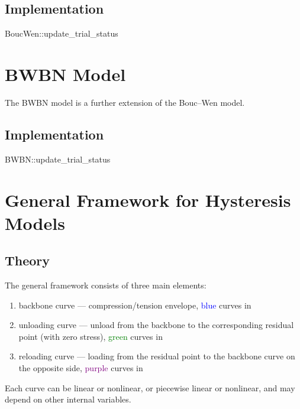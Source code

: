 \subsection{Implementation}
\begin{cppcode}
BoucWen::update_trial_status
\end{cppcode}
\section{BWBN Model}
The BWBN model is a further extension of the Bouc--Wen model.
\subsection{Implementation}
\begin{cppcode}
BWBN::update_trial_status
\end{cppcode}
\section{General Framework for Hysteresis Models}
\subsection{Theory}
The general framework consists of three main elements:
\begin{enumerate}
\item backbone curve --- compression/tension envelope, \textcolor{blue}{blue} curves in 
\item unloading curve --- unload from the backbone to the corresponding residual point (with zero stress), \textcolor{green}{green} curves in 
\item reloading curve --- loading from the residual point to the backbone curve on the opposite side, \textcolor{purple}{purple} curves in 
\end{enumerate}
Each curve can be linear or nonlinear, or piecewise linear or nonlinear, and may depend on other internal variables.

